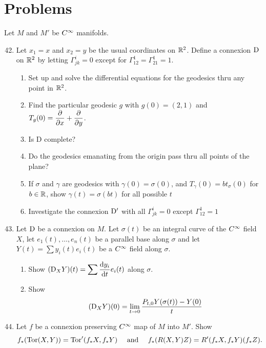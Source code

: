 \documentclass[../main]{subfiles}
\begin{document}
\section*{Problems}
Let $M$ and $M'$ be $C^\infty$ manifolds.
\begin{enumerate}
    \setcounter{enumi}{41}
    \item\label{pro:42} Let $x_1=x$ and $x_2=y$ be the usual coordinates on $\mathbb{R}^2$. Define a connexion $\mathrm{D}$ on $\mathbb{R}^2$ by letting $\Gamma_{jk}^i=0$ except for $\Gamma_{12}^1 = \Gamma_{21}^1=1$. 
    \begin{enumerate}[label = (\roman*)]
        \item Set up and solve the differential equations for the geodesics thru any point in $\mathbb{R}^2$.
        \item Find the particular geodesic $g$ with $g(0)=(2,1)$ and $T_g(0) = \dfrac{\partial }{\partial x}+\dfrac{\partial }{\partial y}$.
        \item Is D complete?
        \item Do the geodesics emanating from the origin pass thru all points of the plane?
        \item If $\sigma$ and $\gamma$ are geodesics with $\gamma(0)=\sigma(0)$, and $T_\gamma(0)=bt_\sigma(0)$ for $b\in \mathbb{R}$, show $\gamma(t)= \sigma(bt)$ for all possible $t$
        \item Investigate the connexion $\mathrm{D}'$ with all $\Gamma_{jk}^i=0$ except $\Gamma_{12}^1=1$
    \end{enumerate} 


    \item\label{pro:43}Let $\mathrm{D}$ be a connexion on $M$. Let $\sigma(t)$ be an integral curve of the $C^\infty$ field $X$, let $e_1(t),\ldots,e_n(t)$ be a parallel base along $\sigma$ and let $Y(t)=\sum y_i(t)e_i(t)$ be a $C^\infty$ field along $\sigma$.
    \begin{enumerate}[label = (\roman*)]
        \item Show $(\mathrm{D}_{X} Y)(t)=\displaystyle \sum \dfrac{\mathrm{d}y_i}{\mathrm{d}t} e_i(t)$ along $\sigma$.
        \item Show \[(\mathrm{D}_{X} Y)(0)=\lim_{t\to 0}\dfrac{P_{t,0} Y(\sigma(t))-Y(0)}{t}\]
    \end{enumerate} 
    
    \item\label{pro:44} Let $f$ be a connexion preserving $C^\infty$ map of $M$ into $M'$. Show \[f_*(\mathrm{Tor}(X, Y))=\mathrm{Tor}'(f_*X,f_*Y)\quad \text{ and } \quad f_*(R(X,Y)Z)=R'(f_*X,f_*Y)(f_*Z).\]


\end{enumerate}
\end{document}
